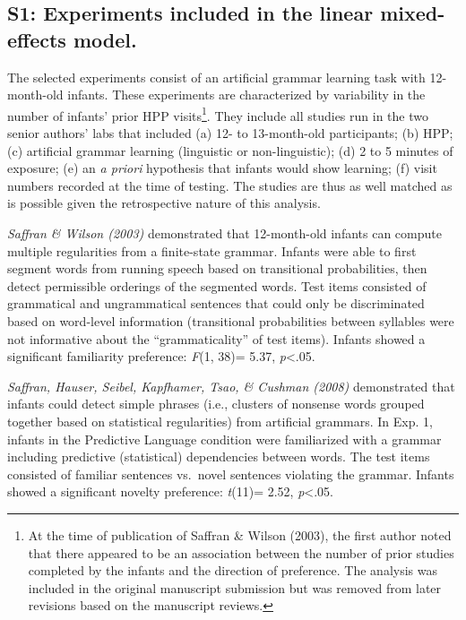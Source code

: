 \documentclass[english,man,man,floatsintext]{apa6}
\begin{document}
\begin{appendix}
\section{}
\hypertarget{s1-experiments-included-in-the-linear-mixed-effects-model.}{%
\subsection{S1: Experiments included in the linear mixed-effects
model.}\label{s1-experiments-included-in-the-linear-mixed-effects-model.}}

The selected experiments consist of an artificial grammar learning task
with 12-month-old infants. These experiments are characterized by
variability in the number of infants' prior HPP visits\footnote{At the
time of publication of Saffran \& Wilson (2003), the first author
noted that there appeared to be an association between the number of
prior studies completed by the infants and the direction of
preference. The analysis was included in the original manuscript
submission but was removed from later revisions based on the
manuscript reviews.}. They include all studies run in the two senior
authors' labs that included (a) 12- to 13-month-old participants; (b)
HPP; (c) artificial grammar learning (linguistic or non-linguistic); (d)
2 to 5 minutes of exposure; (e) an \emph{a priori} hypothesis that
infants would show learning; (f) visit numbers recorded at the time of
testing. The studies are thus as well matched as is possible given the
retrospective nature of this analysis.

\emph{Saffran \& Wilson (2003)} demonstrated that 12-month-old infants
can compute multiple regularities from a finite-state grammar. Infants
were able to first segment words from running speech based on
transitional probabilities, then detect permissible orderings of the
segmented words. Test items consisted of grammatical and ungrammatical
sentences that could only be discriminated based on word-level
information (transitional probabilities between syllables were not
informative about the ``grammaticality'' of test items). Infants showed
a significant familiarity preference: \emph{F}(1, 38)= 5.37,
\emph{p}\textless{}.05.

\emph{Saffran, Hauser, Seibel, Kapfhamer, Tsao, \& Cushman (2008)}
demonstrated that infants could detect simple phrases (i.e., clusters of
nonsense words grouped together based on statistical regularities) from
artificial grammars. In Exp. 1, infants in the Predictive Language
condition were familiarized with a grammar including predictive
(statistical) dependencies between words. The test items consisted of
familiar sentences vs.~novel sentences violating the grammar. Infants
showed a significant novelty preference: \emph{t}(11)= 2.52,
\emph{p}\textless{}.05.


\end{appendix}
\end{document}
